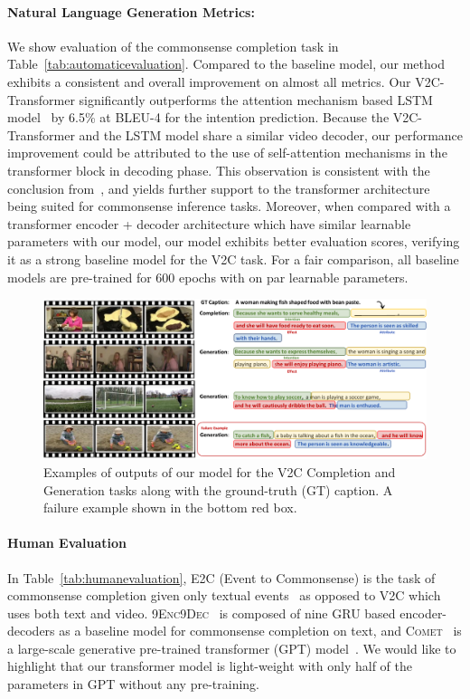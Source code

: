     \paragraph{Natural Language Generation Metrics:}
    We show evaluation of the commonsense completion task in Table~\ref{tab:automaticevaluation}.
    Compared to the baseline model, our method exhibits a consistent and overall improvement on almost all metrics.
    Our V2C-Transformer significantly outperforms the attention mechanism based LSTM model~\cite{venugopalan2015sequence} by 6.5\% at BLEU-4 for the intention prediction.
    Because the V2C-Transformer and the LSTM model share a similar video decoder, our performance improvement could be attributed to the use of self-attention mechanisms in the transformer block in decoding phase. 
    This observation is consistent with the conclusion from~\cite{bosselut2019comet}, and yields further support to the transformer architecture being suited for commonsense inference tasks.
    Moreover, when compared with a transformer encoder + decoder architecture which have similar learnable parameters with our model, our model exhibits better evaluation scores, verifying it as a strong baseline model for the V2C task. For a fair comparison, all baseline models are pre-trained for 600 epochs with on par learnable parameters.
    
    \begin{figure}[t]
        \centering
        \includegraphics[width=\linewidth]{./v2c/fig/qualitative.pdf}
        \caption{Examples of outputs of our model for the V2C Completion and Generation tasks along with the ground-truth (GT) caption.
        A failure example shown in the bottom red box. }
        \label{fig:qualitative}
    \end{figure}  
    
    
    \paragraph{Human Evaluation}
    In Table~\ref{tab:humanevaluation}, {E2C} (Event to Commonsense) is the task of commonsense completion given only textual events~\cite{sap2018atomic,bosselut2019comet} as opposed to V2C which uses both text and video.
    9E\textsc{nc}9D\textsc{ec}~\cite{sap2018atomic} is composed of nine GRU based encoder-decoders as a baseline model for commonsense completion on text, and C\textsc{omet}~\cite{bosselut2019comet} is a large-scale generative pre-trained transformer (GPT) model~\cite{radford2018improving}. 
    We would like to highlight that our transformer model is light-weight with only half of the parameters in GPT without any pre-training. 
    
